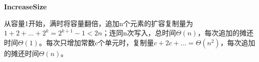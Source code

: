 {\color{ink}\bfseries IncreaseSize}\par\vspace{1bp}从容量1开始，满时将容量翻倍，追加n个元素的扩容复制量为\(1+\allowbreak{}2+\allowbreak{}\ldots +\allowbreak{}2^{k}=\allowbreak{}2^{k+\allowbreak{}1}-1<\allowbreak{}2n\)；连同n次写入，总时间\(\Theta (n)\)，每次追加的摊还时间\(\Theta (1)\)。每次只增加常数c个单元时，复制量\(c+\allowbreak{}2c+\allowbreak{}\ldots =\allowbreak{}\Theta (n^{2})\)，每次追加的摊还时间\(\Theta (n)\)。
